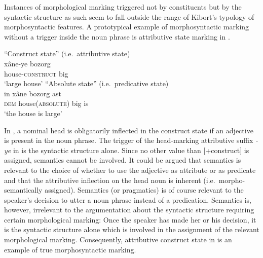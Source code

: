 Instances of morphological marking triggered not by constituents but by the syntactic structure as such seem to fall outside the range of Kibort's typology of morphosyntactic features. A prototypical example of morphosyntactic marking without a trigger inside the noun phrase is attributive state marking in .
\begin{exe}
\ex 
{}
\label{persian state}
\begin{xlist}
\ex 
\textrm{“Construct state” (i.e.~attributive state)}\\
\gll 	xâne-ye bozorg\\
	house-\textsc{construct} big\\
\glt 	‘large house’
\ex 
\textrm{“Absolute state” (i.e.~predicative state)}\\
\gll	in xâne bozorg ast\\
	\textsc{dem} house(\textsc{absolute}) big is\\
\glt	‘the house is large’
\end{xlist}
\end{exe}
In , a nominal head is obligatorily inflected in the construct state if an adjective is present in the noun phrase. The trigger of the head-marking attributive suffix \textit{-ye} in  is the syntactic structure alone. Since no other value than [+construct] is assigned, semantics cannot be involved. It could be argued that semantics is relevant to the choice of whether to use the adjective as attribute or as predicate and that the attributive inflection on the head noun is inherent (i.e.~morpho-semantically assigned). Semantics (or pragmatics) is of course relevant to the speaker's decision to utter a noun phrase instead of a predication. Semantics is, however, irrelevant to the argumentation about the syntactic structure requiring certain morphological marking: Once the speaker has made her or his decision, it is the syntactic structure alone which is involved in the assignment of the relevant morphological marking. Consequently, attributive construct state in  is an example of true morphosyntactic marking.

